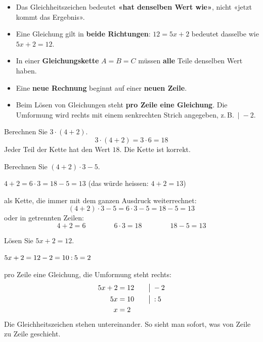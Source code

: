 \documentclass[11pt]{exam}
\begin{document}

\begin{merke}
\begin{itemize}
  \item Das Gleichheitszeichen bedeutet \textbf{«hat denselben Wert wie»},
        nicht «jetzt kommt das Ergebnis».
  \item Eine Gleichung gilt in \textbf{beide Richtungen}:
        $12 = 5x + 2$ bedeutet dasselbe wie $5x + 2 = 12$.
  \item In einer \textbf{Gleichungskette} $A = B = C$ müssen \textbf{alle}
        Teile denselben Wert haben.
  \item Eine \textbf{neue Rechnung} beginnt auf einer \textbf{neuen Zeile}.
  \item Beim Lösen von Gleichungen steht \textbf{pro Zeile eine Gleichung}.
        Die Umformung wird rechts mit einem senkrechten Strich angegeben,
        z.\,B.\ $\big|\; -2$.
\end{itemize}
\end{merke}


\begin{beispiel}
Berechnen Sie $3 \cdot (4 + 2)$.
\[ 3 \cdot (4 + 2) = 3 \cdot 6 = 18 \]
Jeder Teil der Kette hat den Wert $18$. Die Kette ist korrekt.
\end{beispiel}

\begin{beispiel}
Berechnen Sie $(4 + 2) \cdot 3 - 5$.

\falsch\quad $4 + 2 = 6 \cdot 3 = 18 - 5 = 13$
\hfill (das würde heissen: $4 + 2 = 13$)

\richtig\quad als Kette, die immer mit dem ganzen Ausdruck weiterrechnet:
\[ (4 + 2) \cdot 3 - 5 = 6 \cdot 3 - 5 = 18 - 5 = 13 \]
\richtig\quad oder in getrennten Zeilen:
\[ 4 + 2 = 6 \qquad\qquad 6 \cdot 3 = 18 \qquad\qquad 18 - 5 = 13 \]
\end{beispiel}

\begin{beispiel}
Lösen Sie $5x + 2 = 12$.

\falsch\quad $5x + 2 = 12 - 2 = 10 \mathbin{:} 5 = 2$

\richtig\quad pro Zeile eine Gleichung, die Umformung steht rechts:
\begin{align*}
  5x + 2 &= 12 \qquad\big|\;-2 \\
  5x     &= 10 \qquad\big|\;\mathbin{:} 5 \\
  x      &= 2
\end{align*}
Die Gleichheitszeichen stehen untereinander. So sieht man sofort, was
von Zeile zu Zeile geschieht.
\end{beispiel}
\end{document}
